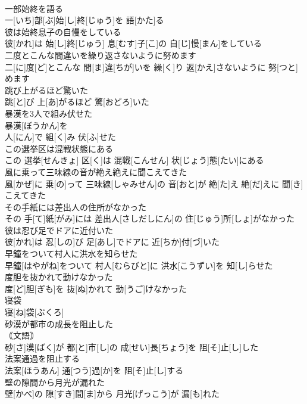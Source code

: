 \documentclass[8pt]{extreport}
\begin{document}
\begin{CJK}{UTF8}{min}
\\	一部始終を語る	
\\	一[いち]部[ぶ]始[し]終[じゅう]を 語[かた]る
\\	彼は始終息子の自慢をしている	
\\	彼[かれ]は 始[し]終[じゅう] 息[むす]子[こ]の 自[じ]慢[まん]をしている
\\	二度とこんな間違いを繰り返さないように努めます	
\\	二[に]度[ど]とこんな 間[ま]違[ちが]いを 繰[く]り 返[かえ]さないように 努[つと]めます
\\	跳び上がるほど驚いた	
\\	跳[と]び 上[あ]がるほど 驚[おどろ]いた
\\	暴漢を3人で組み伏せた	
\\	暴漢[ぼうかん]を 
\\	人[にん]で 組[く]み 伏[ふ]せた
\\	この選挙区は混戦状態にある	
\\	この 選挙[せんきょ] 区[く]は 混戦[こんせん] 状[じょう]態[たい]にある
\\	風に乗って三味線の音が絶え絶えに聞こえてきた	
\\	風[かぜ]に 乗[の]って 三味線[しゃみせん]の 音[おと]が 絶[た]え 絶[だ]えに 聞[き]こえてきた
\\	その手紙には差出人の住所がなかった	
\\	その 手[て]紙[がみ]には 差出人[さしだしにん]の 住[じゅう]所[しょ]がなかった
\\	彼は忍び足でドアに近付いた	
\\	彼[かれ]は 忍[しの]び 足[あし]でドアに 近[ちか]付[づ]いた
\\	早鐘をついて村人に洪水を知らせた	
\\	早鐘[はやがね]をついて 村人[むらびと]に 洪水[こうずい]を 知[し]らせた
\\	度胆を抜かれて動けなかった	
\\	度[ど]胆[ぎも]を 抜[ぬ]かれて 動[うご]けなかった
\\	寝袋	
\\	寝[ね]袋[ぶくろ]
\\	砂漠が都市の成長を阻止した	
\\	｟文語｠
\\	砂[さ]漠[ばく]が 都[と]市[し]の 成[せい]長[ちょう]を 阻[そ]止[し]した
\\	法案通過を阻止する	
\\	法案[ほうあん] 通[つう]過[か]を 阻[そ]止[し]する
\\	壁の隙間から月光が漏れた	
\\	壁[かべ]の 隙[すき]間[ま]から 月光[げっこう]が 漏[も]れた

\end{CJK}
\end{document}
